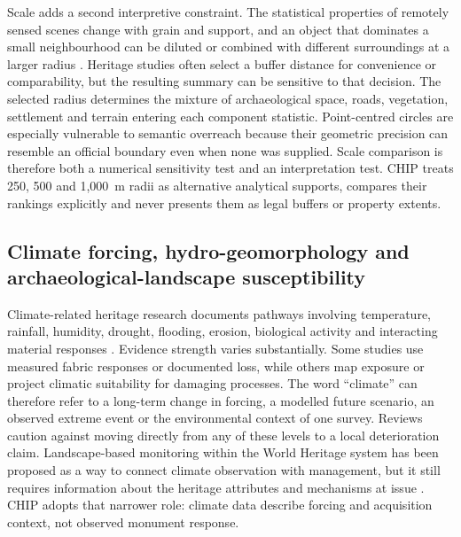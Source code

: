 Scale adds a second interpretive constraint. The statistical properties of remotely sensed scenes change with grain and support, and an object that dominates a small neighbourhood can be diluted or combined with different surroundings at a larger radius \citep{woodcock1987scale}. Heritage studies often select a buffer distance for convenience or comparability, but the resulting summary can be sensitive to that decision. The selected radius determines the mixture of archaeological space, roads, vegetation, settlement and terrain entering each component statistic. Point-centred circles are especially vulnerable to semantic overreach because their geometric precision can resemble an official boundary even when none was supplied. Scale comparison is therefore both a numerical sensitivity test and an interpretation test. CHIP treats 250, 500 and 1,000~m radii as alternative analytical supports, compares their rankings explicitly and never presents them as legal buffers or property extents.

\subsection{Climate forcing, hydro-geomorphology and archaeological-landscape susceptibility}

Climate-related heritage research documents pathways involving temperature, rainfall, humidity, drought, flooding, erosion, biological activity and interacting material responses \citep{fatoric2017threatened,sesana2021climate,orr2021climate}. Evidence strength varies substantially. Some studies use measured fabric responses or documented loss, while others map exposure or project climatic suitability for damaging processes. The word ``climate'' can therefore refer to a long-term change in forcing, a modelled future scenario, an observed extreme event or the environmental context of one survey. Reviews caution against moving directly from any of these levels to a local deterioration claim. Landscape-based monitoring within the World Heritage system has been proposed as a way to connect climate observation with management, but it still requires information about the heritage attributes and mechanisms at issue \citep{guzman2020monitoring}. CHIP adopts that narrower role: climate data describe forcing and acquisition context, not observed monument response.

